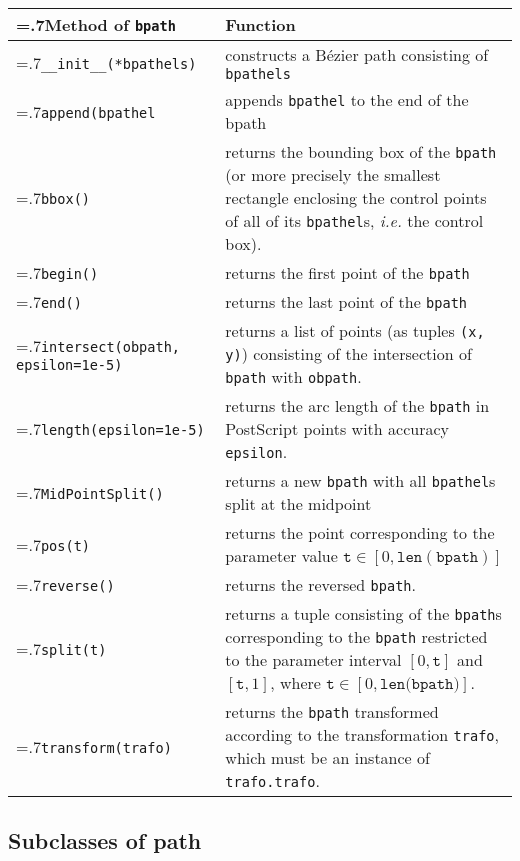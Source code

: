 \medskip
\begin{tabularx}{\linewidth}{>{\hsize=.7\hsize}X>{\raggedright\arraybackslash\hsize=1.3\hsize}X}
  Method of \texttt{bpath} & Function \\
  \hline 
  \texttt{\_\_init\_\_(*bpathels)} &
  constructs a B\'ezier path consisting of \texttt{bpathels}\\
  \texttt{append(bpathel} & appends \texttt{bpathel} to the end of the bpath\\
  \texttt{bbox()} & returns the bounding box of the \texttt{bpath}
  (or more precisely the smallest rectangle enclosing the control
  points of all of its \texttt{bpathel}s, \textit{i.e.} the control
  box).\\
  \texttt{begin()} & returns the first point of the \texttt{bpath}\\
  \texttt{end()} & returns the last point of the \texttt{bpath}\\
  \texttt{intersect(obpath, \newline\phantom{intersect(}epsilon=1e-5)}
  & 
  returns a list of points (as tuples \texttt{(x, y)}) consisting of the intersection of
  \texttt{bpath} with \texttt{obpath}.\\
  \texttt{length(epsilon=1e-5)} & returns the arc length of the \texttt{bpath} in
  PostScript points with accuracy \texttt{epsilon}. \\
  \texttt{MidPointSplit()} & returns a new \texttt{bpath} with all
  \texttt{bpathel}s split at the midpoint\\
  \texttt{pos(t)} & returns the point corresponding to the parameter
  value $\mathtt{t}\in[0, \mathtt{len(bpath)}]$\\
  \texttt{reverse()} & returns the reversed \texttt{bpath}.\\
  \texttt{split(t)} & returns a tuple consisting of the
  \texttt{bpath}s corresponding to the \texttt{bpath} restricted to
  the parameter interval
  $[0,\mathtt{t}]$ and $[\mathtt{t},1]$, where $\mathtt{t}\in[0,\mathtt{len(bpath})]$.\\
  \texttt{transform(trafo)} & returns the \texttt{bpath}
  transformed according to the transformation \texttt{trafo}, which
  must be an instance of
  \texttt{trafo.trafo}.
\end{tabularx}
\medskip


\subsection{Subclasses of path}

